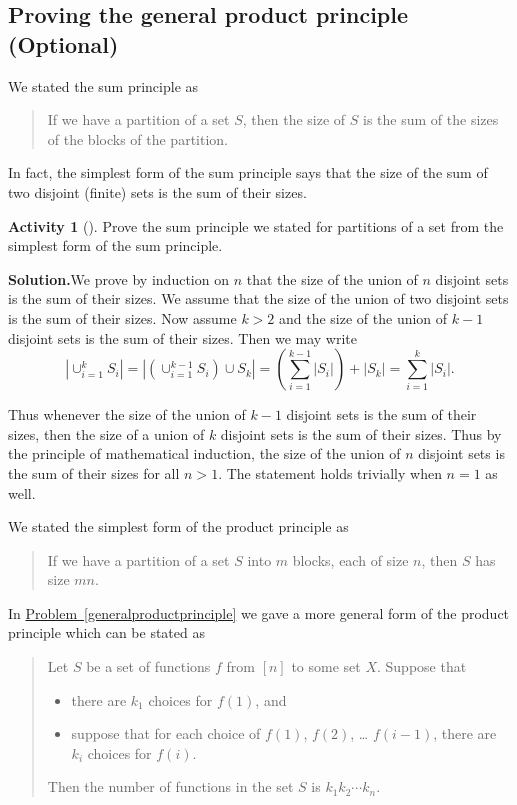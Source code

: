 \documentclass[10pt,]{book}
\theoremstyle{plain}
\theoremstyle{definition}
\newtheorem{activity}[project]{Activity}
\numberwithin{equation}{chapter}
\begin{document}
\subsection[{Proving the general product principle (Optional)}]{Proving the general product principle (Optional)}\label{subsection-14}
We stated the sum principle as%
\begin{quote}\hypertarget{blockquote-9}{}
If we have a partition of a set \(S\), then the size of \(S\) is the sum of the sizes of the blocks of the partition.\end{quote}
In fact, the simplest form of the sum principle says that the size of the sum of two disjoint (finite) sets is the sum of their sizes.%
\begin{activity}[]\label{activity-77}
Prove the sum principle we stated for partitions of a set from the simplest form of the sum principle.%
\par\medskip\noindent%
\textbf{Solution.}\quad We prove by induction on \(n\) that the size of the union of \(n\) disjoint sets is the sum of their sizes. We assume that the size of the union of two disjoint sets is the sum of their sizes. Now assume \(k>2\) and the size of the union of \(k-1\) disjoint sets is the sum of their sizes. Then we may write%
\begin{equation*}
|\cup_{i=1}^k S_i|=|\left(\cup_{i=1}^{k-1}S_i\right)\cup
S_k|=\left(\sum_{i=1}^{k-1}|S_i|\right) +|S_k|=\sum_{i=1}^k|S_i|.
\end{equation*}
%
\par
Thus whenever the size of the union of \(k-1\) disjoint sets is the sum of their sizes, then the size of a union of \(k\) disjoint sets is the sum of their sizes. Thus by the principle of mathematical induction, the size of the union of \(n\) disjoint sets is the sum of their sizes for all \(n>1\). The statement holds trivially when \(n=1\) as well.%
\end{activity}
We stated the simplest form of the product principle as%
\begin{quote}\hypertarget{blockquote-10}{}
If we have a partition of a set \(S\) into \(m\) blocks, each of size \(n\), then \(S\) has size \(mn\).\end{quote}
In \hyperref[generalproductprinciple]{Problem~\ref{generalproductprinciple}} we gave a more general form of the product principle which can be stated as %
\begin{quote}\hypertarget{blockquote-11}{}
Let \(S\) be a set of functions \(f\) from \([n]\) to some set \(X\).  Suppose that \leavevmode%
\begin{itemize}[label=\textbullet]
\item{}there are \(k_1\) choices for \(f(1)\), and%
\item{}suppose that for each choice of \(f(1)\), \(f(2)\), \dots{} \(f(i-1)\), there are \(k_i\) choices for \(f(i)\).%
\end{itemize}
 Then the number of functions in the set \(S\) is \(k_1k_2\cdots k_n\).\end{quote}
\end{document}
